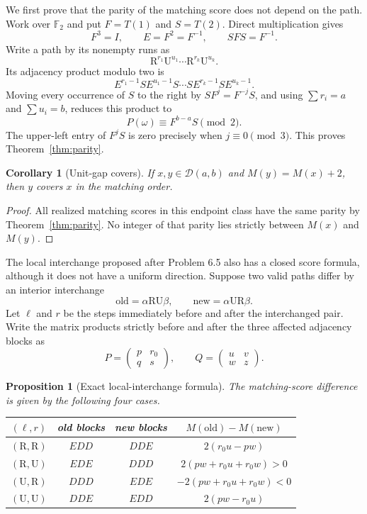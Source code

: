 \documentclass[11pt]{amsart}
\newtheorem{proposition}[theorem]{Proposition}
\newtheorem{corollary}[theorem]{Corollary}
\theoremstyle{definition}
\newcommand{\RR}{\mathrm{R}}
\newcommand{\UU}{\mathrm{U}}
\newcommand{\cD}{\mathcal D}
\newcommand{\Ftwo}{\mathbb F_2}
\begin{document}
We first prove that the parity of the matching score does not depend on the
path.  Work over $\Ftwo$ and put $F=T(1)$ and $S=T(2)$.  Direct multiplication
gives
\[
 F^3=I,\qquad E=F^2=F^{-1},\qquad SFS=F^{-1}.
\]
Write a path by its nonempty runs as
\[
 \RR^{r_1}\UU^{u_1}\cdots\RR^{r_k}\UU^{u_k}.
\]
Its adjacency product modulo two is
\[
 E^{r_1-1}SE^{u_1-1}S\cdots
 SE^{r_k-1}SE^{u_k-1}.
\]
Moving every occurrence of $S$ to the right by
$SF^j=F^{-j}S$, and using $\sum r_i=a$ and $\sum u_i=b$, reduces this product
to
\begin{equation}\label{eq:parity-normal-form}
 P(\omega)\equiv F^{b-a}S\pmod2.
\end{equation}
The upper-left entry of $F^jS$ is zero precisely when $j\equiv0\pmod3$.
This proves Theorem~\ref{thm:parity}.

\begin{corollary}[Unit-gap covers]\label{cor:unit-gap}
If $x,y\in\cD(a,b)$ and $M(y)=M(x)+2$, then $y$ covers $x$ in the matching
order.
\end{corollary}

\begin{proof}
All realized matching scores in this endpoint class have the same parity by
Theorem~\ref{thm:parity}.  No integer of that parity lies strictly between
$M(x)$ and $M(y)$.
\end{proof}

The local interchange proposed after Problem 6.5 also has a closed score
formula, although it does not have a uniform direction.  Suppose two valid
paths differ by an interior interchange
\[
 \text{old}=\alpha\RR\UU\beta,
 \qquad
 \text{new}=\alpha\UU\RR\beta.
\]
Let $\ell$ and $r$ be the steps immediately before and after the interchanged
pair.  Write the matrix products strictly before and after the three affected
adjacency blocks as
\[
 P=\begin{pmatrix}p&r_0\\q&s\end{pmatrix},
 \qquad
 Q=\begin{pmatrix}u&v\\w&z\end{pmatrix}.
\]

\begin{proposition}[Exact local-interchange formula]
\label{prop:local-swap}
The matching-score difference is given by the following four cases.
\begin{center}
\renewcommand{\arraystretch}{1.15}
\begin{tabular}{@{}c c c c@{}}
\toprule
$(\ell,r)$ & old blocks & new blocks & $M(\mathrm{old})-M(\mathrm{new})$\\
\midrule
$(\RR,\RR)$ & $EDD$ & $DDE$ & $2(r_0u-pw)$\\
$(\RR,\UU)$ & $EDE$ & $DDD$ & $2(pw+r_0u+r_0w)>0$\\
$(\UU,\RR)$ & $DDD$ & $EDE$ & $-2(pw+r_0u+r_0w)<0$\\
$(\UU,\UU)$ & $DDE$ & $EDD$ & $2(pw-r_0u)$\\
\bottomrule
\end{tabular}
\end{center}
\end{proposition}
\end{document}

